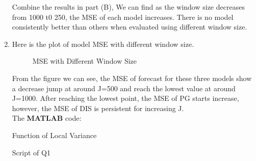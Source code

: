 \documentclass[12pt,letterpaper]{article}
\begin{document}
\begin{enumerate}[label=\textbf{(\Alph*)}]
Combine the results in part (B), We can find as the window size decreases from 1000 t0 250, the MSE of each model increases. There is no model consistently better than others when evaluated using different window size.  

\item 
Here is the plot of model MSE with different window size. 
\begin{figure}[H]
	\centering
	\caption{MSE with Different Window Size}
\end{figure}

From the figure we can see, the MSE of forecast for these three models show a decrease jump at around J=500 and reach the lowest value at around J=1000. After reaching the lowest point, the MSE of PG starts increase, however, the MSE of DIS is persistent for increasing J.\\



The \textbf{MATLAB} code:

Function of Local Variance

Script of Q1


\end{enumerate}
 
\end{document}
